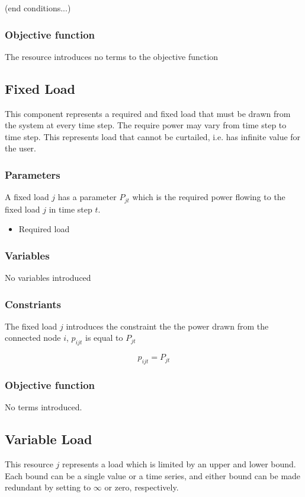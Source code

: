 \documentclass[]{report}
\begin{document}
(end conditions...)

\subsubsection*{Objective function}
The resource introduces no terms to the objective function

\newpage

\subsection{Fixed Load}
This component represents a required and fixed load that must be drawn from the system at every time step. The require power may vary from time step to time step. This represents load that cannot be curtailed, i.e. has infinite value for the user. 

\subsubsection{Parameters}
A fixed load $j$ has a parameter $P_{jt}$ which is the required power flowing to the fixed load $j$ in time step $t$.

\begin{itemize}
    \item [$P_{jt}$] Required load
\end{itemize}

\subsubsection{Variables}
No variables introduced

\subsubsection{Constriants}
The fixed load $j$ introduces the constraint the the power drawn from the connected node $i$, $p_{ijt}$ is equal to $P_{jt}$

\begin{equation}
    p_{ijt} = P_{jt}
\end{equation}

\subsubsection{Objective function}
No terms introduced.

\newpage
\subsection{Variable Load}
This resource $j$ represents a load which is limited by an upper and lower bound. Each bound can be a single value or a time series, and either bound can be made redundant by setting to $\infty$ or zero, respectively.
\end{document}
